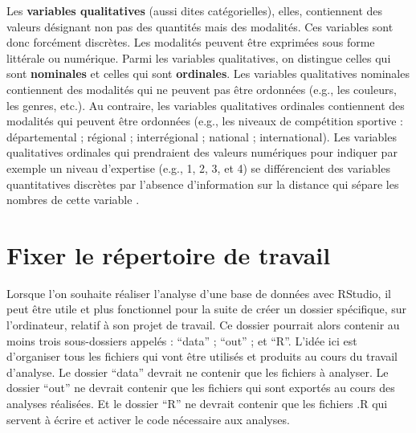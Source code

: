 \documentclass[
]{book}
\begin{document}
Les \textbf{variables qualitatives} (aussi dites catégorielles), elles, contiennent des valeurs désignant non pas des quantités mais des modalités. Ces variables sont donc forcément discrètes. Les modalités peuvent être exprimées sous forme littérale ou numérique. Parmi les variables qualitatives, on distingue celles qui sont \textbf{nominales} et celles qui sont \textbf{ordinales}. Les variables qualitatives nominales contiennent des modalités qui ne peuvent pas être ordonnées (e.g., les couleurs, les genres, etc.). Au contraire, les variables qualitatives ordinales contiennent des modalités qui peuvent être ordonnées (e.g., les niveaux de compétition sportive : départemental ; régional ; interrégional ; national ; international). Les variables qualitatives ordinales qui prendraient des valeurs numériques pour indiquer par exemple un niveau d'expertise (e.g., 1, 2, 3, et 4) se différencient des variables quantitatives discrètes par l'absence d'information sur la distance qui sépare les nombres de cette variable \autocite{labreucheDifferentsTypesVariables2010}.

\hypertarget{fixer-le-ruxe9pertoire-de-travail}{%
\section{Fixer le répertoire de travail}\label{fixer-le-ruxe9pertoire-de-travail}}

Lorsque l'on souhaite réaliser l'analyse d'une base de données avec RStudio, il peut être utile et plus fonctionnel pour la suite de créer un dossier spécifique, sur l'ordinateur, relatif à son projet de travail. Ce dossier pourrait alors contenir au moins trois sous-dossiers appelés : ``data'' ; ``out'' ; et ``R''. L'idée ici est d'organiser tous les fichiers qui vont être utilisés et produits au cours du travail d'analyse. Le dossier ``data'' devrait ne contenir que les fichiers à analyser. Le dossier ``out'' ne devrait contenir que les fichiers qui sont exportés au cours des analyses réalisées. Et le dossier ``R'' ne devrait contenir que les fichiers .R qui servent à écrire et activer le code nécessaire aux analyses.
\end{document}
